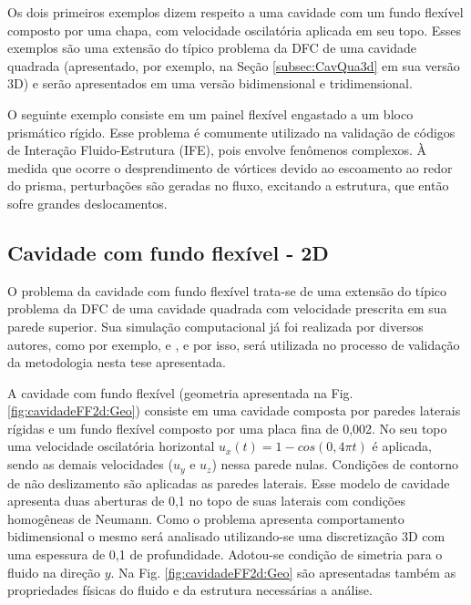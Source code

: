 \documentclass[tese_patricia]{subfiles}
\begin{document}
Os dois primeiros exemplos dizem respeito a uma cavidade com um fundo flexível composto por uma chapa, com velocidade oscilatória aplicada em seu topo. Esses exemplos são uma extensão do típico problema da DFC de uma cavidade quadrada (apresentado, por exemplo, na Seção \ref{subsec:CavQua3d} em sua versão 3D) e serão apresentados em uma versão bidimensional e tridimensional.

O seguinte exemplo consiste em um painel flexível engastado a um bloco prismático rígido. Esse problema é comumente utilizado na validação de códigos de Interação Fluido-Estrutura (IFE), pois envolve fenômenos complexos. À medida que ocorre o desprendimento de vórtices devido ao escoamento ao redor do prisma, perturbações são geradas no fluxo, excitando a estrutura, que então sofre grandes deslocamentos.

\subsection{Cavidade com fundo flexível - 2D}

O problema da cavidade com fundo flexível trata-se de uma extensão do típico problema da DFC de uma cavidade quadrada com velocidade prescrita em sua parede superior. Sua simulação computacional já foi realizada por diversos autores, como por exemplo,  e , e  por isso, será utilizada no processo de validação da metodologia nesta tese apresentada.

A cavidade com fundo flexível (geometria apresentada na Fig. \ref{fig:cavidadeFF2d:Geo}) consiste em uma cavidade composta por paredes laterais rígidas e um fundo flexível composto por uma placa fina de 0,002. No seu topo uma velocidade oscilatória horizontal $u_x(t)=1-cos(0,4 \pi t)$ é aplicada, sendo as demais velocidades ($u_y$ e $u_z$) nessa parede nulas. Condições de contorno de não deslizamento são aplicadas as paredes laterais. Esse modelo de cavidade apresenta duas aberturas de 0,1 no topo de suas laterais com condições homogêneas de Neumann. Como o problema apresenta comportamento bidimensional o mesmo será analisado utilizando-se uma discretização 3D com uma espessura de 0,1 de profundidade. Adotou-se condição de simetria para o fluido na direção $y$.  Na Fig. \ref{fig:cavidadeFF2d:Geo} são apresentadas também as propriedades físicas do fluido e da estrutura necessárias a análise.
\end{document}
